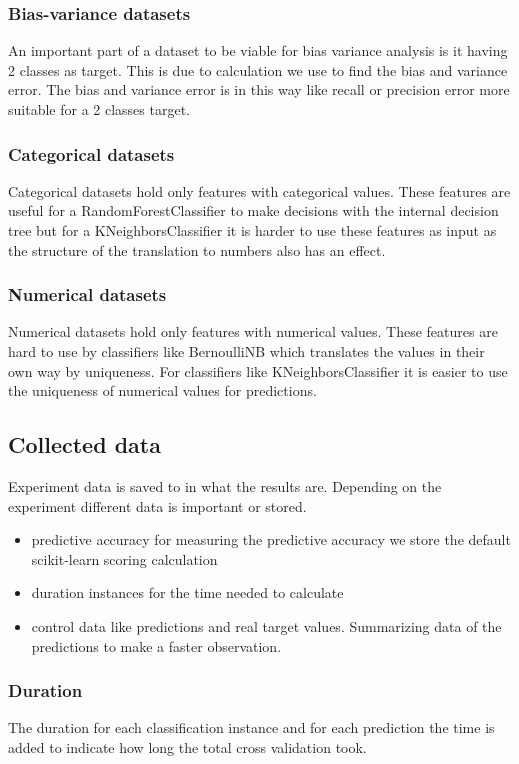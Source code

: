 \documentclass[a4paper,10pt]{article}
\begin{document}
\subsubsection{Bias-variance datasets}
An important part of a dataset to be viable for bias variance analysis is it having 2 classes as target. This is due to calculation we use to find the bias and variance error. The bias and variance error is in this way like recall or precision error more suitable for a 2 classes target.  %
\subsubsection{Categorical datasets}
Categorical datasets hold only features with categorical values. These features are useful for a RandomForestClassifier to make decisions with the internal decision tree but for a KNeighborsClassifier it is harder to use these features as input as the structure of the translation to numbers also has an effect.
\subsubsection{Numerical datasets}
Numerical datasets hold only features with numerical values. These features are hard to use by classifiers like BernoulliNB which translates the values in their own way by uniqueness. For classifiers like KNeighborsClassifier it is easier to use the uniqueness of numerical values for predictions.

\subsection{Collected data}
Experiment data is saved to in what the results are. Depending on the experiment different data is important or stored. 
\begin{itemize}
	\item predictive accuracy for measuring the predictive accuracy we store the default scikit-learn scoring calculation
	\item duration instances for the time needed to calculate 
	\item control data like predictions and real target values. Summarizing data of the predictions to make a faster observation. 
\end{itemize}
\subsubsection{Duration}
The duration for each classification instance and for each prediction the time is added to indicate how long the total cross validation took. 
\end{document}
